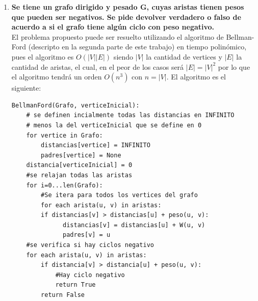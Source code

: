 \documentclass{article}
\newcommand\tab[1][0.5cm]{\hspace*{#1}}
\begin{document}
\begin{enumerate}
        \item \textbf{Se tiene un grafo dirigido y pesado G, cuyas aristas tienen pesos que pueden ser negativos. Se pide
            devolver verdadero o falso de acuerdo a si el grafo tiene algún ciclo con peso negativo.} \\
            \tab El problema propuesto puede ser resuelto utilizando el algoritmo de Bellman-Ford (descripto en la segunda
            parte de este trabajo) en tiempo polinómico, pues el algoritmo es $O(|V||E|)$ siendo $|V|$ la cantidad de
            vertices y $|E|$ la cantidad de aristas, el cual, en el peor de los casos será $|E|=|V|^2$ por lo que
            el algoritmo tendrá un orden $O(n^3)$ con $n = |V|$. El algoritmo es el siguiente:
            \begin{lstlisting}
BellmanFord(Grafo, verticeInicial):
    # se definen incialmente todas las distancias en INFINITO
    # menos la del verticeInicial que se define en 0
    for vertice in Grafo:
        distancias[vertice] = INFINITO
        padres[vertice] = None
    distancia[verticeInicial] = 0
    #se relajan todas las aristas
    for i=0...len(Grafo):
        #Se itera para todos los vertices del grafo
        for each arista(u, v) in aristas:
        if distancias[v] > distancias[u] + peso(u, v):
              distancias[v] = distancias[u] + W(u, v)
              padres[v] = u
    #se verifica si hay ciclos negativo
    for each arista(u, v) in aristas:
        if distancia[v] > distancia[u] + peso(u, v):
            #Hay ciclo negativo
            return True
        return False
            \end{lstlisting}


\end{enumerate}
\end{document}

